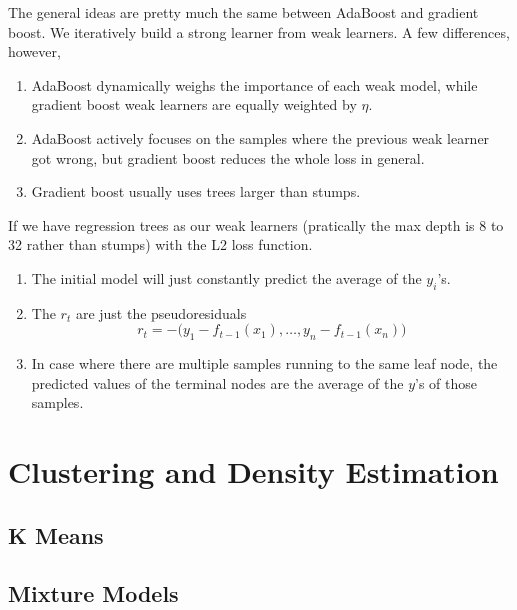 \documentclass{article}
\begin{document}
    The general ideas are pretty much the same between AdaBoost and gradient boost. We iteratively build a strong learner from weak learners. A few differences, however, 
    \begin{enumerate}
      \item AdaBoost dynamically weighs the importance of each weak model, while gradient boost weak learners are equally weighted by $\eta$. 
      \item AdaBoost actively focuses on the samples where the previous weak learner got wrong, but gradient boost reduces the whole loss in general. 
      \item Gradient boost usually uses trees larger than stumps. 
    \end{enumerate}

    \begin{example}
      If we have regression trees as our weak learners (pratically the max depth is 8 to 32 rather than stumps) with the L2 loss function.  
      \begin{enumerate}
        \item The initial model will just constantly predict the average of the $y_i$'s. 
        \item The $r_t$ are just the pseudoresiduals
          \begin{equation}
            r_t = -\big( y_1 - f_{t-1} (x_1), \ldots, y_n - f_{t-1} (x_n) \big)
          \end{equation}
        \item In case where there are multiple samples running to the same leaf node, the predicted values of the terminal nodes are the average of the $y$'s of those samples. 
      \end{enumerate}
    \end{example}

\section{Clustering and Density Estimation} 

  \subsection{K Means} 

  \subsection{Mixture Models}
\end{document}
